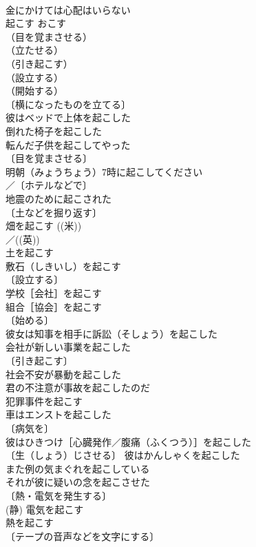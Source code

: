 \documentclass[8pt]{extreport}
\begin{document}
\begin{CJK}{UTF8}{min}
\\	金にかけては心配はいらない 
\\	起こす	おこす	
\\	（目を覚まさせる）
\\	（立たせる）
\\	（引き起こす）
\\	（設立する）
\\	（開始する）
\\	〔横になったものを立てる〕
\\	彼はベッドで上体を起こした 
\\	倒れた椅子を起こした 
\\	転んだ子供を起こしてやった 
\\	〔目を覚まさせる〕
\\	明朝（みょうちょう）7時に起こしてください 
\\	／〔ホテルなどで〕
\\	地震のために起こされた 
\\	〔土などを掘り返す〕　
\\	畑を起こす ((米))
\\	／((英))
\\	土を起こす 
\\	敷石（しきいし）を起こす 
\\	〔設立する〕
\\	学校［会社］を起こす 
\\	組合［協会］を起こす 
\\	〔始める〕
\\	彼女は知事を相手に訴訟（そしょう）を起こした 
\\	会社が新しい事業を起こした 
\\	〔引き起こす〕
\\	社会不安が暴動を起こした 
\\	君の不注意が事故を起こしたのだ 
\\	犯罪事件を起こす 
\\	車はエンストを起こした 
\\	〔病気を〕　
\\	彼はひきつけ［心臓発作／腹痛（ふくつう）］を起こした 
\\	〔生（しょう）じさせる〕 彼はかんしゃくを起こした 
\\	また例の気まぐれを起こしている 
\\	それが彼に疑いの念を起こさせた 
\\	〔熱・電気を発生する〕　
\\	(静) 電気を起こす 
\\	熱を起こす 
\\	〔テープの音声などを文字にする〕　

\end{CJK}
\end{document}
